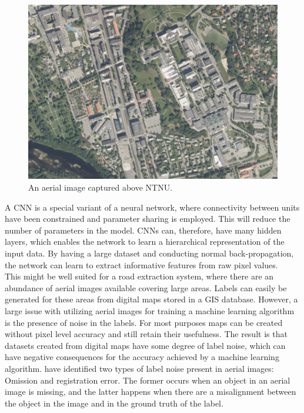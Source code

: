 \begin{figure}[t]
\begin{center}
\includegraphics[width=0.8\columnwidth]{figs/aerial_image.png}
\caption[Aerial image]{An aerial image captured above NTNU.}
\label{fig:aerialimage}
\end{center}
\end{figure}

A \ac{CNN} is a special variant of a neural network, where connectivity between units have been constrained and parameter sharing is employed. This will reduce the number of parameters in the model. \ac{CNN}s can, therefore, have many hidden layers, which enables the network to learn a hierarchical representation of the input data. By having a large dataset and conducting normal back-propagation, the network can learn to extract informative features from raw pixel values. \\

This might be well suited for a road extraction system, where there are an abundance of aerial images available covering large areas. Labels can easily be generated for these areas from digital maps stored in a \ac{GIS} database. However, a large issue with utilizing aerial images for training a machine learning algorithm is the presence of noise in the labels. For most purposes maps can be created without pixel level accuracy and still retain their usefulness. The result is that datasets created from digital maps have some degree of label noise, which can have negative consequences for the accuracy achieved by a machine learning algorithm. \cite{Mnih_aerial_images_noisy} have identified two types of label noise present in aerial images: Omission and registration error. The former occurs when an object in an aerial image is missing, and the latter happens when there are a misalignment between the object in the image and in the ground truth of the label.

